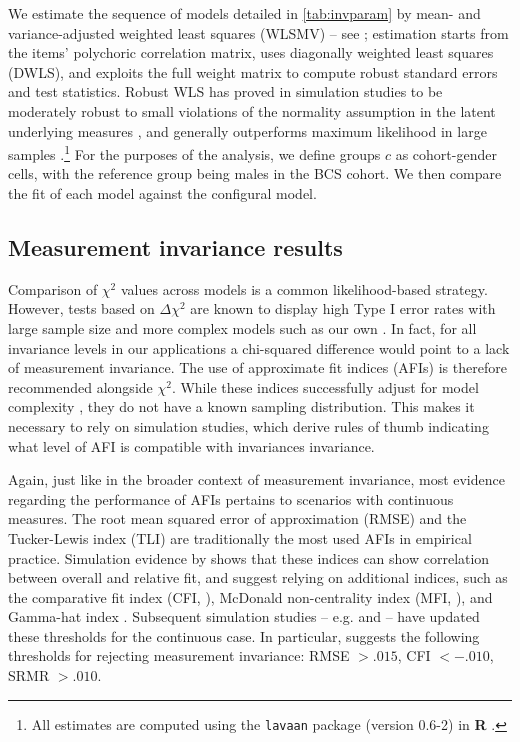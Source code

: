 We estimate the sequence of models detailed in \autoref{tab:invparam} by mean- and variance-adjusted weighted least squares (WLSMV) -- see \citet{Muthen1997}; estimation starts from the items' polychoric correlation matrix, uses diagonally weighted least squares (DWLS), and exploits the full weight matrix to compute robust standard errors and test statistics. Robust WLS has proved in simulation studies to be moderately robust to small violations of the normality assumption in the latent underlying measures \citep{Flora2004}, and generally outperforms maximum likelihood in large samples \citep{Beauducel2006,Li2016}.\footnote{All estimates are computed using the \texttt{lavaan} package (version 0.6-2) in \textbf{\textsf{R}} \citep{Rosseel2012}.}
For the purposes of the analysis, we define groups $c$ as cohort-gender cells, with the reference group being males in the BCS cohort. We then compare the fit of each model against the configural model.


\subsection{Measurement invariance results \label{sec:mires}}

Comparison of $\chi^2$ values across models is a common likelihood-based strategy. However, tests based on $\Delta \chi^2$ are known to display high Type I error rates with large sample size and more complex models such as our own \citep{Sass2014}. In fact, for all invariance levels in our applications a chi-squared difference would point to a lack of measurement invariance. The use of approximate fit indices (AFIs) is therefore recommended alongside $\chi^2$. While these indices successfully adjust for model complexity \citep{Cheung2002}, they do not have a known sampling distribution. This makes it necessary to rely on simulation studies, which derive rules of thumb indicating what level of \textDelta AFI is compatible with invariances invariance.

Again, just like in the broader context of measurement invariance, most evidence regarding the performance of AFIs pertains to scenarios with continuous measures. The root mean squared error of approximation (RMSE) and the Tucker-Lewis index (TLI) are traditionally the most used AFIs in empirical practice. Simulation evidence by \citet{Cheung2002} shows that these indices can show correlation between overall and relative fit, and suggest relying on additional indices, such as the comparative fit index (CFI, \citealp{Bentler1990}), McDonald non-centrality index (MFI, \citealp{McDonald1989}), and Gamma-hat index \citep{Steiger1989}. Subsequent simulation studies -- e.g. \citet{Chen2007} and \citet{Meade2008} -- have updated these thresholds for the continuous case. In particular, \citet{Chen2007} suggests the following thresholds for rejecting measurement invariance: \textDelta RMSE $> .015$, \textDelta CFI $< - .010$, \textDelta SRMR $> .010$. 

